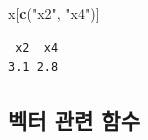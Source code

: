 \documentclass[
  11pt,
]{krantz}
\newenvironment{Shaded}{\begin{snugshade}}{\end{snugshade}}
\newcommand{\KeywordTok}[1]{\textcolor[rgb]{0.27,0.27,0.27}{\textbf{#1}}}
\newcommand{\NormalTok}[1]{#1}
\newcommand{\StringTok}[1]{\textcolor[rgb]{0.5,0.5,0.5}{#1}}
\begin{document}
\begin{Shaded}
\begin{Highlighting}[]
\NormalTok{x[}\KeywordTok{c}\NormalTok{(}\StringTok{"x2"}\NormalTok{, }\StringTok{"x4"}\NormalTok{)]}
\end{Highlighting}
\end{Shaded}

\begin{verbatim}
 x2  x4 
3.1 2.8 
\end{verbatim}

\normalsize

\hypertarget{uxbca1uxd130-uxad00uxb828-uxd568uxc218}{%
\subsection{벡터 관련 함수}\label{uxbca1uxd130-uxad00uxb828-uxd568uxc218}}

  

\printindex
\end{document}
